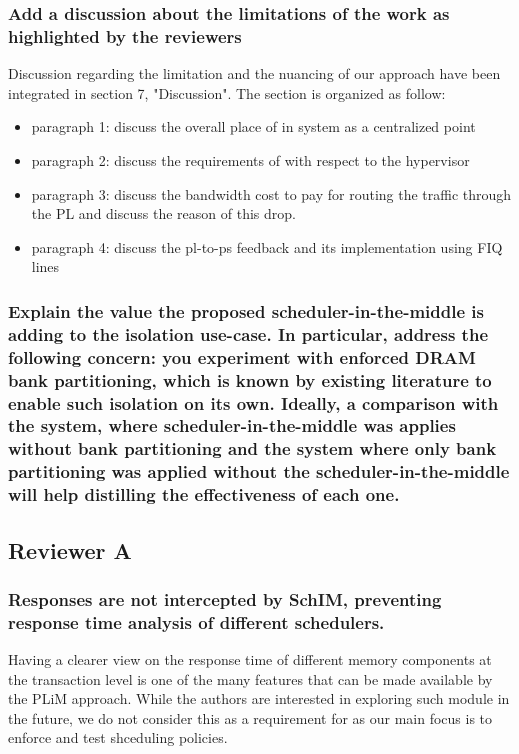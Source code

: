         \subsubsection{Add a discussion about the limitations of the work as highlighted by the reviewers}
            Discussion regarding the limitation and the nuancing of our approach have been integrated in section 7, "Discussion".
            The section is organized as follow:
            \begin{itemize}
                \item paragraph 1: discuss the overall place of \schim in system as a centralized point
                \item paragraph 2: discuss the requirements of \schim with respect to the hypervisor
                \item paragraph 3: discuss the bandwidth cost to pay for routing the traffic through the PL and discuss the reason of this drop.
                \item paragraph 4: discuss the pl-to-ps feedback and its implementation using FIQ lines
            \end{itemize}

        \subsubsection{Explain the value the proposed scheduler-in-the-middle is adding to the isolation use-case. In particular, address the following concern: you experiment with enforced DRAM bank partitioning, which is known by existing literature to enable such isolation on its own. Ideally, a comparison with the system, where scheduler-in-the-middle was applies without bank partitioning and the system where only bank partitioning was applied without the scheduler-in-the-middle will help distilling the effectiveness of each one.}


    \subsection{Reviewer A}
        \subsubsection{Responses are not intercepted by SchIM, preventing response time analysis of different schedulers.}
            Having a clearer view on the response time of different memory components at the transaction level is one of the many features that can be made available by the PLiM approach. While the authors are interested in exploring such module in the future, we do not consider this as a requirement for \schim as our main focus is to enforce and test shceduling policies.

